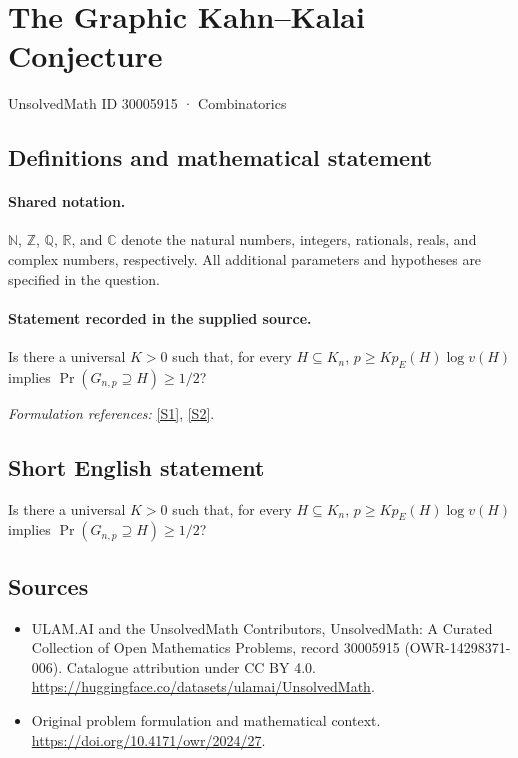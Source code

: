 \documentclass[11pt]{article}
\newcommand{\sref}[2]{\hyperlink{source:#1:#2}{[S#2]}}
\begin{document}
\setcounter{section}{30005914}
\section{The Graphic Kahn–Kalai Conjecture}\label{30005915}
{\small UnsolvedMath ID 30005915 · Combinatorics}
\subsection{Definitions and mathematical statement}

\paragraph{Shared notation.}$\mathbb N$, $\mathbb Z$, $\mathbb Q$, $\mathbb R$, and $\mathbb C$ denote the natural numbers, integers, rationals, reals, and complex numbers, respectively. All additional parameters and hypotheses are specified in the question.


\paragraph{Statement recorded in the supplied source.}
Is there a universal $K>0$ such that, for every $H\subseteq K_n$, $p\geq Kp_E(H)\log v(H)$ implies $\Pr(G_{n,p}\supseteq H)\geq1/2$?
\par\smallskip\textit{Formulation references:} \sref{30005915}{1}, \sref{30005915}{2}.
\subsection{Short English statement}
Is there a universal $K>0$ such that, for every $H\subseteq K_n$, $p\geq Kp_E(H)\log v(H)$ implies $\Pr(G_{n,p}\supseteq H)\geq1/2$?
\subsection{Sources}
\begin{itemize}
\item[\hypertarget{source:30005915:1}{S1}] ULAM.AI and the UnsolvedMath Contributors, UnsolvedMath: A Curated Collection of Open Mathematics Problems, record 30005915 (OWR-14298371-006). Catalogue attribution under CC BY 4.0.
\url{https://huggingface.co/datasets/ulamai/UnsolvedMath}.
\item[\hypertarget{source:30005915:2}{S2}] Original problem formulation and mathematical context.
\url{https://doi.org/10.4171/owr/2024/27}.
\end{itemize}
\label{end:30005915}
\end{document}

